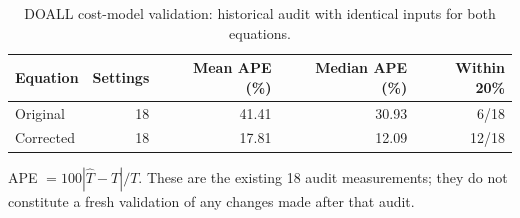 \begin{table}[htbp]\centering
\small
\begin{tabular}{lrrrr}
\toprule
Equation & Settings & Mean APE (\%) & Median APE (\%) & Within 20\% \\
\midrule
Original & 18 & 41.41 & 30.93 & 6/18 \\
Corrected & 18 & 17.81 & 12.09 & 12/18 \\
\bottomrule
\end{tabular}
\caption{DOALL cost-model validation: historical audit with identical inputs for both equations.}\label{tab:doall-summary}
\par\medskip\begin{minipage}{0.98\linewidth}\footnotesize APE $=100|\widehat T-T|/T$. These are the existing 18 audit measurements; they do not constitute a fresh validation of any changes made after that audit.\end{minipage}
\end{table}
